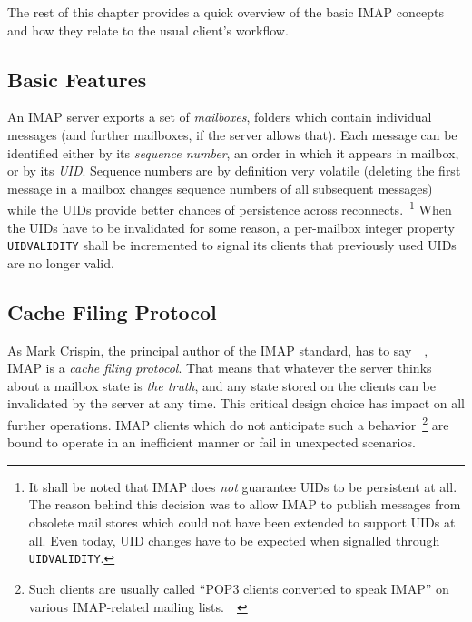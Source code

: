 \documentclass[trojita]{subfiles}
\begin{document}
The rest of this chapter provides a quick overview of the basic IMAP concepts and how they relate to the usual client's
workflow.

\subsection{Basic Features}

An IMAP server exports a set of {\em mailboxes}, folders which contain individual messages (and further mailboxes, if
the server allows that).  Each message can be identified either by its {\em sequence number}, an order in which it
appears in mailbox, or by its {\em UID}.  Sequence numbers are by definition very volatile (deleting the first message
in a mailbox changes sequence numbers of all subsequent messages) while the UIDs provide better chances of persistence
across reconnects.~\footnote{It shall be noted that IMAP does {\em not} guarantee UIDs to be persistent at all.  The
reason behind this decision was to allow IMAP to publish messages from obsolete mail stores which could not have been
extended to support UIDs at all.  Even today, UID changes have to be expected when signalled through {\tt UIDVALIDITY}.}
When the UIDs have to be invalidated for some reason, a per-mailbox integer property {\tt UIDVALIDITY} shall be
incremented to signal its clients that previously used UIDs are no longer valid.

\subsection{Cache Filing Protocol}

As Mark Crispin, the principal author of the IMAP standard, has to
say~\cite{crispin-imap-cache-filing-1}~\cite{crispin-imap-cache-filing-2}, IMAP is a {\em cache filing protocol}.  That
means that whatever the server thinks about a mailbox state is {\em the truth}, and any state stored on the clients can
be invalidated by the server at any time.  This critical design choice has impact on all further operations.  IMAP
clients which do not anticipate such a behavior~\footnote{Such clients are usually called ``POP3 clients converted to
speak IMAP'' on various IMAP-related mailing
lists.~\cite{shannon-imap-clients-glorified-pop}~\cite{crispin-imap-clients-glorified-pop}} are bound to operate in an
inefficient manner or fail in unexpected scenarios.
\end{document}
